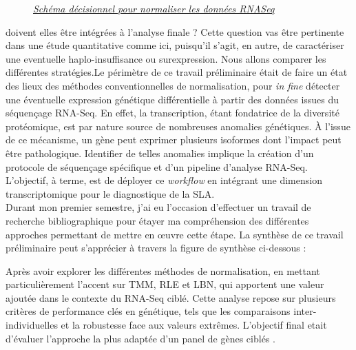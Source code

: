\begin{figure}[ht]
{
}
\caption{\underline{\textit{ Schéma décisionnel pour normaliser les données RNASeq}}}
\end{figure}

 doivent elles être intégrées à l'analyse finale ? Cette question vas être pertinente dans une étude quantitative comme ici, puisqu'il s'agit, en autre, de caractériser une eventuelle haplo-insuffisance ou surexpression. 
 Nous allons comparer les différentes stratégies.Le périmètre de ce travail préliminaire était de faire un état des lieux des méthodes conventionnelles de normalisation,
pour \textit{in fine} détecter une éventuelle expression génétique différentielle à partir des données issues du séquençage RNA-Seq.
En effet, la transcription, étant fondatrice de la diversité protéomique, est par nature source de nombreuses anomalies génétiques. À l’issue de ce mécanisme,
un gène peut exprimer plusieurs isoformes dont l’impact peut être pathologique. Identifier de telles anomalies implique la création d’un protocole de séquençage spécifique et
d’un pipeline d’analyse RNA-Seq. L’objectif, à terme, est de déployer ce \textit{workflow} en intégrant une dimension transcriptomique pour le diagnostique de la SLA.\\
Durant mon premier semestre, j’ai eu l’occasion d’effectuer un travail de recherche bibliographique pour étayer ma compréhension des différentes approches permettant de mettre en œuvre cette étape.
La synthèse de ce travail préliminaire peut s’apprécier à travers la figure de synthèse ci-dessous :



Après avoir explorer les différentes méthodes de normalisation, en mettant particulièrement l'accent sur TMM, RLE et LBN, qui apportent une valeur ajoutée dans le contexte du RNA-Seq ciblé. Cette analyse repose sur plusieurs critères de performance clés en génétique, tels que les comparaisons inter-individuelles et la robustesse face aux valeurs extrêmes.
 L'objectif final etait d'évaluer l'approche la plus adaptée  d'un panel de gènes ciblés .

